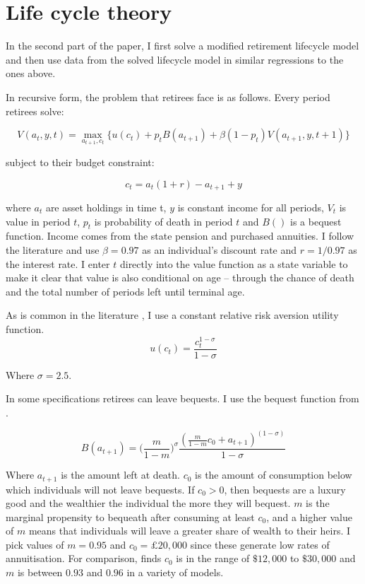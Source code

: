 \documentclass[12pt]{article}
\begin{document}
\section{Life cycle theory}

In the second part of the paper, I first solve a modified retirement lifecycle
model and then use data from the solved lifecycle model in similar regressions
to the ones above.

In recursive form, the problem that retirees face is as follows. Every period
retirees solve:

\begin{equation*}
    V(a_{t}, y, t) = \underset{a_{t+1}, c_{t}}{\max} \{ u(c_{t}) + p_{t}B(a_{t+1}) + \beta(1-p_{t})V(a_{t+1}, y, t+1) \}
\end{equation*}

subject to their budget constraint:

\begin{equation*}
    c_{t} =a_{
    t}(1 +r) -  a_{t+1} + y
\end{equation*}

where $a_{t}$ are asset holdings in time t, $y$ is constant income for all
periods, $V_{t}$ is value in period $t$, $p_{t}$ is probability of death in
period $t$ and $B()$ is a bequest function. Income comes from the state pension
and purchased annuities. I follow the literature and use $\beta = 0.97$ as an
individual's discount rate and $r = 1/0.97$ as the interest rate. I enter $t$
directly into the value function as a state variable to make it clear that value
is also conditional on age -- through the chance of death and the total number
of periods left until terminal age.

As is common in the literature \citep{lockwood_red_2012}, I use a constant relative
risk aversion utility function.
\begin{equation*}
    u(c_{t}) = \frac{c_{t}^{1 - \sigma}}{1 - \sigma}
\end{equation*}

Where $\sigma = 2.5$.

In some specifications retirees can leave bequests. I use the bequest function
from \cite{lockwood_red_2012,lockwood_aer_2018}.

\begin{equation*}
    B(a_{t+1}) = \bigl( \frac{m}{1 - m} \bigr)^{\sigma}  \frac{(\frac{m}{1 - m}c_{0} + a_{t+1})^{(1 - \sigma)}}{1 - \sigma}
\end{equation*}

Where $a_{t+1}$ is the amount left at death. $c_{0}$ is the amount of
consumption below which individuals will not leave bequests. If $c_{0} >0$, then
bequests are a luxury good and the wealthier the individual the more they will
bequest. $m$ is the marginal propensity to bequeath after consuming at least
$c_{0}$, and a higher value of $m$ means that individuals will leave a greater
share of wealth to their heirs. I pick values of $m = 0.95$ and $c_{0} = \pounds
    20,000$ since these generate low rates of annuitisation. For comparison,
\cite{lockwood_aer_2018} finds $c_{0}$ is in the range of $\$12,000$ to
$\$30,000$ and $m$ is between $0.93$ and $0.96$ in a variety of models.
\end{document}
